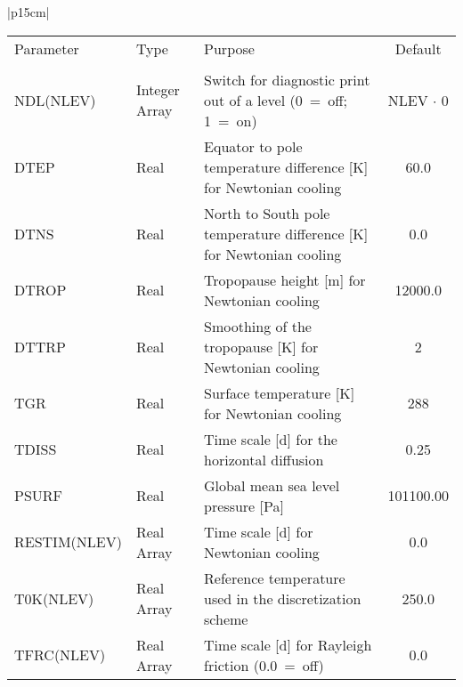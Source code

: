 \begin{center}
\begin{tabular}{|p{15cm}|}
\hline
\begin{center}
\begin{tabular}{l l p{5cm} c} %
Parameter & Type & Purpose & Default \\
&&&\\
NDL(NLEV) & Integer Array & Switch for diagnostic print out of a level (0~=~off; 1~=~on)
& NLEV $\cdot$ 0 \\
DTEP  & Real & Equator to pole temperature difference [K] for Newtonian cooling & 60.0 \\ 
DTNS  & Real & North to South pole temperature difference [K] for Newtonian cooling & 0.0 \\   
DTROP & Real & Tropopause height [m] for Newtonian cooling & 12000.0 \\  
DTTRP & Real & Smoothing of the tropopause [K] for Newtonian cooling & 2 \\
TGR   & Real & Surface temperature [K] for Newtonian cooling & 288 \\
TDISS & Real & Time scale [d] for the horizontal diffusion & 0.25 \\
PSURF & Real & Global mean sea level pressure [Pa] & 101100.00 \\
RESTIM(NLEV)  & Real Array & Time scale [d] for Newtonian cooling & 0.0 \\
T0K(NLEV)  & Real Array & Reference temperature used in the discretization scheme & 250.0 \\
TFRC(NLEV) & Real Array & Time scale [d] for Rayleigh friction (0.0~=~off)& 0.0
\end{tabular} 
\end{center}
\vspace{3mm} \\
\hline


\end{tabular}
\end{center}
